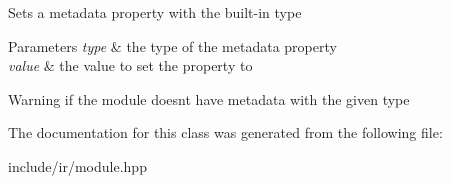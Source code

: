 Sets a metadata property with the built-\/in type 
\begin{DoxyParams}{Parameters}
{\em type} & the type of the metadata property \\
\hline
{\em value} & the value to set the property to \\
\hline
\end{DoxyParams}
\begin{DoxyWarning}{Warning}
if the module doesn\textquotesingle{}t have metadata with the given type 
\end{DoxyWarning}


The documentation for this class was generated from the following file\+:\begin{DoxyCompactItemize}
\item 
include/ir/module.\+hpp\end{DoxyCompactItemize}
